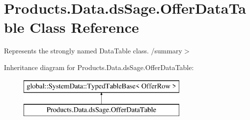 \hypertarget{class_products_1_1_data_1_1ds_sage_1_1_offer_data_table}{}\section{Products.\+Data.\+ds\+Sage.\+Offer\+Data\+Table Class Reference}
\label{class_products_1_1_data_1_1ds_sage_1_1_offer_data_table}


Represents the strongly named Data\+Table class. /summary$>$  


Inheritance diagram for Products.\+Data.\+ds\+Sage.\+Offer\+Data\+Table\+:\begin{figure}[H]
\begin{center}
\leavevmode
\includegraphics[height=2.000000cm]{class_products_1_1_data_1_1ds_sage_1_1_offer_data_table}
\end{center}
\end{figure}
